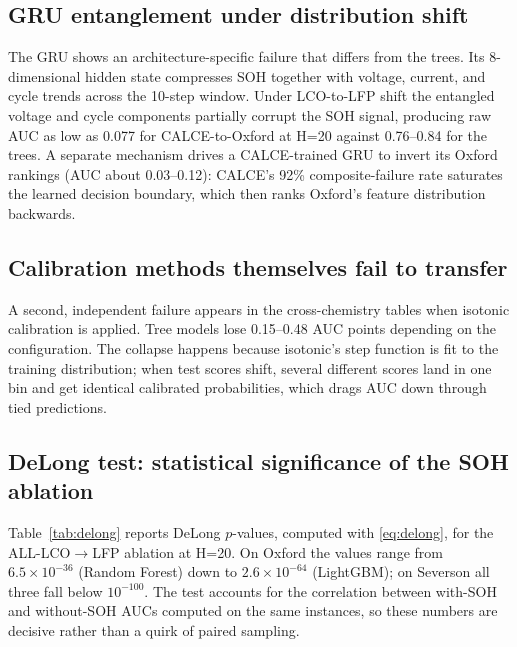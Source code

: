 \documentclass[journal]{IEEEtran}
\begin{document}
\subsection{GRU entanglement under distribution shift}
The GRU shows an architecture-specific failure that differs from the trees. Its 8-dimensional hidden state compresses SOH together with voltage, current, and cycle trends across the 10-step window. Under LCO-to-LFP shift the entangled voltage and cycle components partially corrupt the SOH signal, producing raw AUC as low as 0.077 for CALCE-to-Oxford at H=20 against 0.76--0.84 for the trees. A separate mechanism drives a CALCE-trained GRU to invert its Oxford rankings (AUC about 0.03--0.12): CALCE's 92\% composite-failure rate saturates the learned decision boundary, which then ranks Oxford's feature distribution backwards.

\subsection{Calibration methods themselves fail to transfer}
A second, independent failure appears in the cross-chemistry tables when isotonic calibration is applied. Tree models lose 0.15--0.48 AUC points depending on the configuration. The collapse happens because isotonic's step function is fit to the training distribution; when test scores shift, several different scores land in one bin and get identical calibrated probabilities, which drags AUC down through tied predictions.

\subsection{DeLong test: statistical significance of the SOH ablation}
Table~\ref{tab:delong} reports DeLong $p$-values, computed with \eqref{eq:delong}, for the ALL-LCO$\to$LFP ablation at H=20. On Oxford the values range from $6.5\times10^{-36}$ (Random Forest) down to $2.6\times10^{-64}$ (LightGBM); on Severson all three fall below $10^{-100}$. The test accounts for the correlation between with-SOH and without-SOH AUCs computed on the same instances, so these numbers are decisive rather than a quirk of paired sampling.
\end{document}
